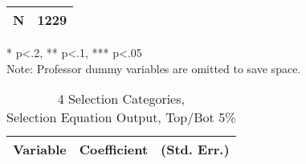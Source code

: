 \begin{sidewaystable}[htb]
\begin{threeparttable}
\begin{tabular}{l|c|c|c|c|c|c}
      \hline
      N        &         \multicolumn{6}{|c}{1229}                            \\
      \hline
      \hline
    \end{tabular}
    \begin{tablenotes}
    \item{* p<.2, ** p<.1, *** p<.05 \\ Note: Professor dummy variables are omitted to save space.}
    \end{tablenotes}
  \end{threeparttable}
\end{sidewaystable}

\clearpage{}


\newpage{}

\begin{table}[htb]\centering
  \begin{threeparttable}
    \caption{4 Selection Categories, \\Selection Equation Output, Top/Bot 5\%}\label{table:b10}
    \begin{tabular}{l c c}
      \hline\hline 
      \multicolumn{1}{c}{\textbf{Variable}} & {\textbf{Coefficient}} & \textbf{(Std. Err.)} \\ 
      \hline
      \hline 


\end{tabular}
\end{threeparttable}
\end{table}
